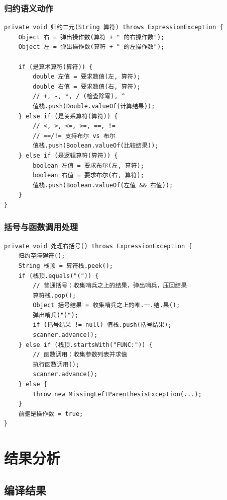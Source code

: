 \documentclass[a4paper]{article}
\begin{document}
\subsubsection{归约语义动作}

\begin{lstlisting}[caption={二元算符归约（简化）}, label={lst:reduce-binary}]
private void 归约二元(String 算符) throws ExpressionException {
    Object 右 = 弹出操作数(算符 + " 的右操作数");
    Object 左 = 弹出操作数(算符 + " 的左操作数");

    if (是算术算符(算符)) {
        double 左值 = 要求数值(左, 算符);
        double 右值 = 要求数值(右, 算符);
        // +, -, *, / (检查除零), ^
        值栈.push(Double.valueOf(计算结果));
    } else if (是关系算符(算符)) {
        // <, >, <=, >=, ==, !=
        // ==/!= 支持布尔 vs 布尔
        值栈.push(Boolean.valueOf(比较结果));
    } else if (是逻辑算符(算符)) {
        boolean 左值 = 要求布尔(左, 算符);
        boolean 右值 = 要求布尔(右, 算符);
        值栈.push(Boolean.valueOf(左值 && 右值));
    }
}
\end{lstlisting}

\subsubsection{括号与函数调用处理}

\begin{lstlisting}[caption={右括号处理——区分普通括号与函数调用}, label={lst:rparen}]
private void 处理右括号() throws ExpressionException {
    归约至障碍符();
    String 栈顶 = 算符栈.peek();
    if (栈顶.equals("(")) {
        // 普通括号：收集哨兵之上的结果，弹出哨兵，压回结果
        算符栈.pop();
        Object 括号结果 = 收集哨兵之上的唯.一.结.果();
        弹出哨兵(")");
        if (括号结果 != null) 值栈.push(括号结果);
        scanner.advance();
    } else if (栈顶.startsWith("FUNC:")) {
        // 函数调用：收集参数列表并求值
        执行函数调用();
        scanner.advance();
    } else {
        throw new MissingLeftParenthesisException(...);
    }
    前驱是操作数 = true;
}
\end{lstlisting}

\section{结果分析}

\subsection{编译结果}
\end{document}
